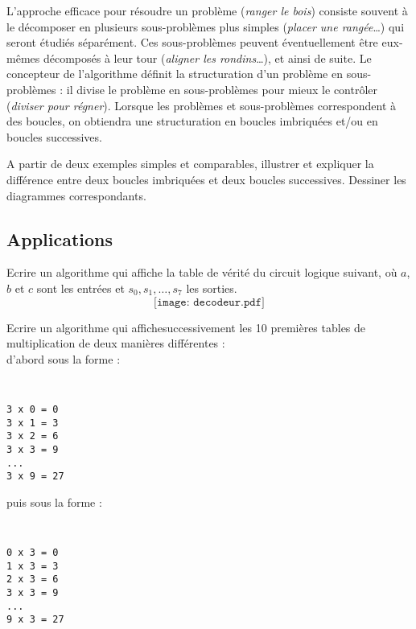 L'approche efficace pour résoudre un problème (\emph{ranger le bois}) consiste
souvent à le décomposer en plusieurs sous-problèmes plus simples
(\emph{placer une rangée}\ldots) qui seront étudiés
séparément. Ces sous-problèmes peuvent éventuellement être eux-mêmes décomposés 
à leur tour (\emph{aligner les rondins}\ldots), et ainsi de suite.
Le concepteur de l'algorithme définit la structuration d'un problème en sous-problèmes : 
il divise le problème en sous-problèmes pour mieux le contrôler (\emph{diviser pour régner}).
Lorsque les problèmes et sous-problèmes correspondent à des boucles, on obtiendra
une structuration en boucles imbriquées et/ou en boucles successives.

\begin{question}
A partir de deux exemples sim\-ples et comparables, illustrer et expliquer la différence
entre deux boucles imbriquées et deux boucles successives.
Dessiner les diagrammes \uml{} correspondants.
\end{question}

\subsection{Applications}
\begin{question} Ecrire un algorithme qui affiche
la table de vérité du circuit logique suivant, où $a$, $b$ et $c$ sont les entrées et 
$s_0, s_1, \ldots, s_7$ les sorties.
$$\texttt{[image: decodeur.pdf]}$$
\end{question}

\begin{question} Ecrire un algorithme
qui affiche\linebreak successivement les 10 premières tables de multiplication de deux manières 
différentes : \\
d'abord sous la forme :
\begin{minipage}[t]{3cm}\tt
\begin{Verbatim}
3 x 0 = 0
3 x 1 = 3
3 x 2 = 6
3 x 3 = 9
...
3 x 9 = 27
\end{Verbatim}
\end{minipage}
\hfill
puis sous la forme :
\begin{minipage}[t]{3cm}\tt
\begin{Verbatim}
0 x 3 = 0
1 x 3 = 3
2 x 3 = 6
3 x 3 = 9
...
9 x 3 = 27
\end{Verbatim}
\end{minipage}
\end{question}

